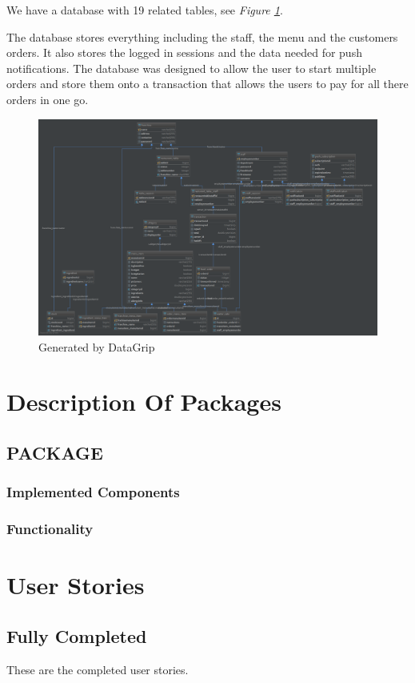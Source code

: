 \documentclass[12pt, twoside, a4paper]{report}
\begin{document}
We have a database with 19 related tables, see \textit{Figure \ref{fig:data}}. 

The database stores everything including the staff, the menu and the customers orders. 
It also stores the logged in sessions and the data needed for push notifications.
The database was designed to allow the user to start multiple orders and store them onto a transaction that allows the users to pay for all there orders in one go.

\begin{figure}[H]
  \centering
  \includegraphics[width=15cm]{database.png}
  \caption{Generated by DataGrip}
  \label{fig:data}
\end{figure}

\chapter*{Description Of Packages}
\section*{PACKAGE}
\subsection*{Implemented Components}
\subsection*{Functionality}

\chapter*{User Stories}
\section*{Fully Completed}
These are the completed user stories.
\end{document}
